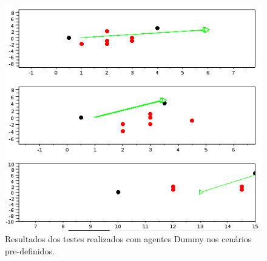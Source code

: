 \begin{figure}[H]
\centering
{}
\includegraphics[scale=0.6]{figuras/cenario456.png}
\caption{Resultados dos testes realizados com agentes Dummy nos cenários pre-definidos.} 
\label{fig:cenario456}
\end{figure}
\FloatBarrier

